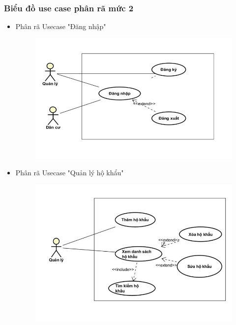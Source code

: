 \documentclass{article}
\begin{document}
\subsubsection{Biểu đồ use case phân rã mức 2}
\begin{itemize}
    \item Phân rã Usecase "Đăng nhập"
    \begin{figure}[H]
        \centering
        \includegraphics{Ảnh chương 2/Đăng nhập.jpg}
    \end{figure}
\vspace{5cm}
    \item Phân rã Usecase "Quản lý hộ khẩu"
    \begin{figure}[H]
        \centering
        \includegraphics{Ảnh chương 2/Hộ khẩu.jpg}
    \end{figure}


\end{itemize}
\end{document}
